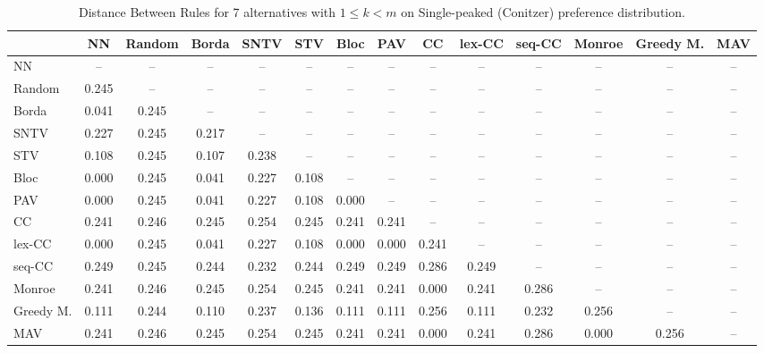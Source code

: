 
\begin{table*}
\centering
\begin{tabular}{lccccccccccccc}
\toprule
 & NN & Random & Borda & SNTV & STV & Bloc & PAV & CC & lex-CC & seq-CC & Monroe & Greedy M. & MAV \\
\midrule
NN & -- & -- & -- & -- & -- & -- & -- & -- & -- & -- & -- & -- & -- \\
Random & 0.245 & -- & -- & -- & -- & -- & -- & -- & -- & -- & -- & -- & -- \\
Borda & 0.041 & 0.245 & -- & -- & -- & -- & -- & -- & -- & -- & -- & -- & -- \\
SNTV & 0.227 & 0.245 & 0.217 & -- & -- & -- & -- & -- & -- & -- & -- & -- & -- \\
STV & 0.108 & 0.245 & 0.107 & 0.238 & -- & -- & -- & -- & -- & -- & -- & -- & -- \\
Bloc & 0.000 & 0.245 & 0.041 & 0.227 & 0.108 & -- & -- & -- & -- & -- & -- & -- & -- \\
PAV & 0.000 & 0.245 & 0.041 & 0.227 & 0.108 & 0.000 & -- & -- & -- & -- & -- & -- & -- \\
CC & 0.241 & 0.246 & 0.245 & 0.254 & 0.245 & 0.241 & 0.241 & -- & -- & -- & -- & -- & -- \\
lex-CC & 0.000 & 0.245 & 0.041 & 0.227 & 0.108 & 0.000 & 0.000 & 0.241 & -- & -- & -- & -- & -- \\
seq-CC & 0.249 & 0.245 & 0.244 & 0.232 & 0.244 & 0.249 & 0.249 & 0.286 & 0.249 & -- & -- & -- & -- \\
Monroe & 0.241 & 0.246 & 0.245 & 0.254 & 0.245 & 0.241 & 0.241 & 0.000 & 0.241 & 0.286 & -- & -- & -- \\
Greedy M. & 0.111 & 0.244 & 0.110 & 0.237 & 0.136 & 0.111 & 0.111 & 0.256 & 0.111 & 0.232 & 0.256 & -- & -- \\
MAV & 0.241 & 0.246 & 0.245 & 0.254 & 0.245 & 0.241 & 0.241 & 0.000 & 0.241 & 0.286 & 0.000 & 0.256 & -- \\
\bottomrule
\end{tabular}

\caption{Distance Between Rules for 7 alternatives with $1 \leq k < m$ on Single-peaked (Conitzer) preference distribution.}
\end{table*}
